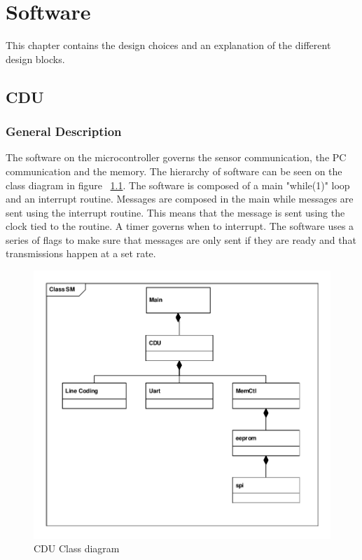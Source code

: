 \chapter{Software}
This chapter contains the design choices and an explanation of the different design blocks.

\section{CDU}
\subsection{General Description}
The software on the microcontroller governs the sensor communication, the PC communication and the memory. The hierarchy of software can be seen on the class diagram in figure ~\ref{fig:cduclassd}. The software is composed of a main "while(1)" loop and an interrupt routine. Messages are composed in the main while messages are sent using the interrupt routine. This means that the message is sent using the clock tied to the routine. A timer governs when to interrupt. The software uses a series of flags to make sure that messages are only sent if they are ready and that transmissions happen at a set rate.\\

\begin{figure}[H]
\centering
\includegraphics[scale=0.8]{billeder/CDUClassDiagramme}
\caption{CDU Class diagram}
\label{fig:cduclassd}
\end{figure}
